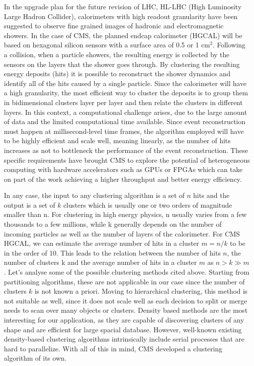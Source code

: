 In the upgrade plan for the future revision of LHC, HL-LHC (High Luminosity Large Hadron Collider), calorimeters with high readout granularity have been suggested to observe fine grained images of hadronic and electromagnetic showers\cite{high_granularity}. In the case of CMS, the planned endcap calorimeter (HGCAL) will be based on hexagonal silicon sensors with a surface area of 0.5 or 1 cm$^2$\cite{hgcal}. Following a collision, when a particle showers, the resulting energy is collected by the sensors on the layers that the shower goes through. By clustering the resulting energy deposits (hits) it is possible to reconstruct the shower dynamics and identify all of the hits caused by a single particle. Since the calorimeter will have a high granularity, the most efficient way to cluster the deposits is to group them in bidimensional clusters layer per layer\cite{2d} and then relate the clusters in different layers. In this context, a computational challenge arises, due to the large amount of data and the limited computational time available. Since event reconstruction must happen at millisecond-level time frames, the algorithm employed will have to be highly efficient and scale well, meaning linearly, as the number of hits increases as not to bottleneck the performance of the event reconstruction. These specific requirements have brought CMS to explore the potential of heterogeneous computing with hardware accelerators such as GPUs or FPGAs which can take on part of the work achieving a higher throughput and better energy efficiency. 

In any case, the input to any clustering algorithm is a set of $n$ hits and the output is a set of $k$ clusters which is usually one or two orders of magnitude smaller than n. For clustering in high energy physics, n usually varies from a few thousands to a few millions, while k generally depends on the number of incoming particles as well as the number of layers of the calorimeter. For CMS HGCAL, we can estimate the average number of hits in a cluster $m=n/k$ to be in the order of 10. This leads to the relation between the number of hits $n$, the number of clusters k and the average number of hits in a cluster $m$ as $n > k \gg m$. Let's analyse some of the possible clustering methods cited above. Starting from partitioning algorithms, these are not applicable in our case since the number of clusters $k$ is not known a priori. Moving to hierarchical clustering, this method is not suitable as well, since it does not scale well as each decision to split or merge needs to scan over many objects or clusters. Density based methods are the most interesting for our application, as they are capable of discovering clusters of any shape and are efficient for large spacial database. However, well-known existing density-based clustering algorithms intrinsically include serial processes that are hard to parallelize. With all of this in mind, CMS developed a clustering algorithm of its own.

